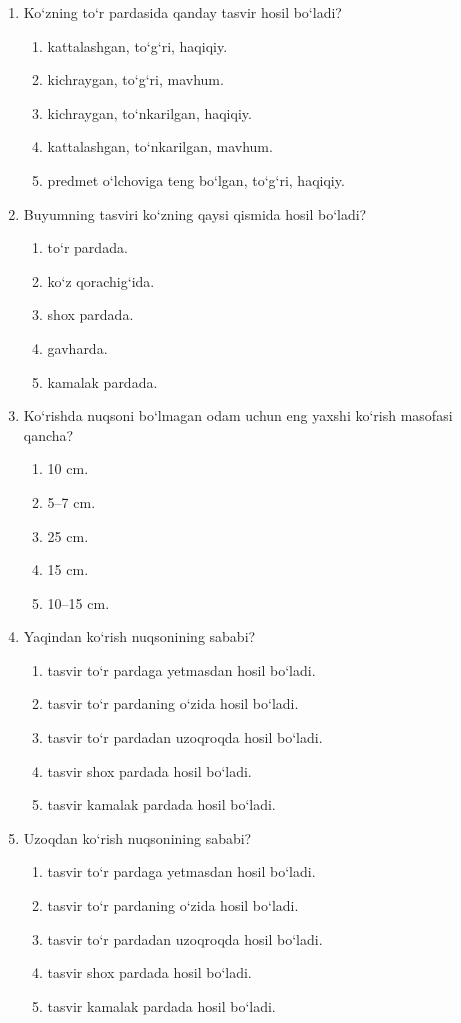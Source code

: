 \begin{enumerate}
\item Ko‘zning to‘r pardasida qanday tasvir hosil bo‘ladi?
\begin{enumerate}[label=\Alph*)]
\item kattalashgan, to‘g‘ri, haqiqiy.
\item kichraygan, to‘g‘ri, mavhum.
\item kichraygan, to‘nkarilgan, haqiqiy.
\item kattalashgan, to‘nkarilgan, mavhum.
\item predmet o‘lchoviga teng bo‘lgan, to‘g‘ri, haqiqiy.
\end{enumerate}

\item Buyumning tasviri ko‘zning qaysi qismida hosil bo‘ladi?
\begin{enumerate}[label=\Alph*)]
\item to‘r pardada.
\item ko‘z qorachig‘ida.
\item shox pardada.
\item gavharda.
\item kamalak pardada.
\end{enumerate}

\item Ko‘rishda nuqsoni bo‘lmagan odam uchun eng yaxshi ko‘rish masofasi qancha?
\begin{enumerate}[label=\Alph*)]
\item 10 cm.
\item 5--7 cm.
\item 25 cm.
\item 15 cm.
\item 10--15 cm.
\end{enumerate}

\item Yaqindan ko‘rish nuqsonining sababi?
\begin{enumerate}[label=\Alph*)]
\item tasvir to‘r pardaga yetmasdan hosil bo‘ladi.
\item tasvir to‘r pardaning o‘zida hosil bo‘ladi.
\item tasvir to‘r pardadan uzoqroqda hosil bo‘ladi.
\item tasvir shox pardada hosil bo‘ladi.
\item tasvir kamalak pardada hosil bo‘ladi.
\end{enumerate}

\item Uzoqdan ko‘rish nuqsonining sababi?
\begin{enumerate}[label=\Alph*)]
\item tasvir to‘r pardaga yetmasdan hosil bo‘ladi.
\item tasvir to‘r pardaning o‘zida hosil bo‘ladi.
\item tasvir to‘r pardadan uzoqroqda hosil bo‘ladi.
\item tasvir shox pardada hosil bo‘ladi.
\item tasvir kamalak pardada hosil bo‘ladi.
\end{enumerate}


\end{enumerate}
